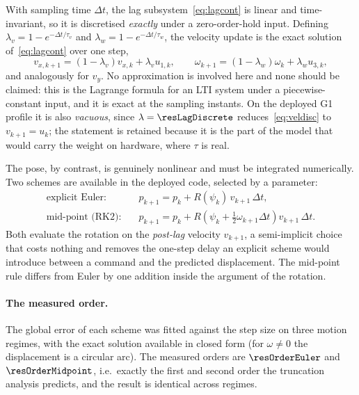 \documentclass[11pt,a4paper]{article}
\begin{document}
With sampling time $\Delta t$, the lag subsystem~\eqref{eq:lagcont} is linear and time-invariant, so it is
discretised \emph{exactly} under a zero-order-hold input. Defining
$\lambda_v = 1-e^{-\Delta t/\tau_v}$ and $\lambda_w = 1-e^{-\Delta t/\tau_w}$, the velocity update is the
exact solution of~\eqref{eq:lagcont} over one step,
\begin{equation}
  v_{x,k+1}=(1-\lambda_v)v_{x,k}+\lambda_v u_{1,k},\qquad
  \omega_{k+1}=(1-\lambda_w)\omega_{k}+\lambda_w u_{3,k},
  \label{eq:veldisc}
\end{equation}
and analogously for $v_y$. No approximation is involved here and none should be claimed: this is the Lagrange
formula for an LTI system under a piecewise-constant input, and it is exact at the sampling instants. On the
deployed G1 profile it is also \emph{vacuous}, since $\lambda=\resLagDiscrete$ reduces~\eqref{eq:veldisc} to
$v_{k+1}=u_k$; the statement is retained because it is the part of the model that would carry the weight on
hardware, where $\tau$ is real.

The pose, by contrast, is genuinely nonlinear and must be integrated numerically. Two schemes are available
in the deployed code, selected by a parameter:
\begin{align}
  \text{explicit Euler:}\quad & p_{k+1} = p_k + R(\psi_k)\,v_{k+1}\,\Delta t,
  \label{eq:euler}\\
  \text{mid-point (RK2):}\quad & p_{k+1} = p_k + R\!\left(\psi_k+\tfrac{1}{2}\omega_{k+1}\Delta t\right)v_{k+1}\,\Delta t.
  \label{eq:midpoint}
\end{align}
Both evaluate the rotation on the \emph{post-lag} velocity $v_{k+1}$, a semi-implicit choice that costs
nothing and removes the one-step delay an explicit scheme would introduce between a command and the predicted
displacement. The mid-point rule differs from Euler by one addition inside the argument of the rotation.

\paragraph{The measured order.} The global error of each scheme was fitted against the step size on three
motion regimes, with the exact solution available in closed form (for $\omega\neq0$ the displacement is a
circular arc). The measured orders are $\resOrderEuler$ and $\resOrderMidpoint$, i.e.\ exactly the first and
second order the truncation analysis predicts, and the result is identical across regimes.
\end{document}
